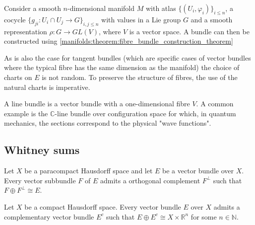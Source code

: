 	\begin{construct}\label{manifolds:vector_bundle_construction}
		Consider a smooth $n$-dimensional manifold $M$ with atlas $\{(U_i, \varphi_i)\}_{i\leq n}$, a cocycle $\{g_{ji}: U_i\cap U_j\rightarrow G\}_{i,j\leq n}$ with values in a Lie group $G$ and a smooth representation $\rho:G\rightarrow GL(V)$, where $V$ is a vector space. A bundle can then be constructed using \ref{manifolds:theorem:fibre_bundle_construction_theorem}
	\end{construct}

	\begin{remark}
		As is also the case for tangent bundles (which are specific cases of vector bundles where the typical fibre has the same dimension as the manifold) the choice of charts on $E$ is not random. To preserve the structure of fibres, the use of the natural charts is imperative.
	\end{remark}
	
	\begin{example}
		A line bundle is a vector bundle with a one-dimensional fibre $V$. A common example is the $\mathbb{C}$-line bundle over configuration space for which, in quantum mechanics, the sections correspond to the physical "wave functions".
	\end{example}
	
\subsection{Whitney sums}

	
	\begin{property}
		Let $X$ be a paracompact Hausdorff space and let $E$ be a vector bundle over $X$. Every vector subbundle $F$ of $E$ admits a orthogonal complement $F^\perp$ such that $F\oplus F^\perp \cong E$.
	\end{property}
	\begin{property}\label{bundles:prop:hausdorff}
		Let $X$ be a compact Hausdorff space. Every vector bundle $E$ over $X$ admits a complementary vector bundle $E^c$ such that $E\oplus E^c \cong X\times\mathbb{R}^n$ for some $n\in\mathbb{N}$.
	\end{property}
	

